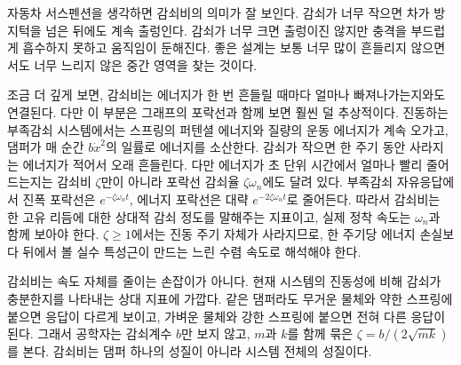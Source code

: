 자동차 서스펜션을 생각하면 감쇠비의 의미가 잘 보인다.
감쇠가 너무 작으면 차가 방지턱을 넘은 뒤에도 계속 출렁인다.
감쇠가 너무 크면 출렁이진 않지만 충격을 부드럽게 흡수하지 못하고 움직임이 둔해진다.
좋은 설계는 보통 너무 많이 흔들리지 않으면서도 너무 느리지 않은 중간 영역을 찾는 것이다.

조금 더 깊게 보면, 감쇠비는 에너지가 한 번 흔들릴 때마다 얼마나 빠져나가는지와도 연결된다.
다만 이 부분은 그래프의 포락선과 함께 보면 훨씬 덜 추상적이다.
진동하는 부족감쇠 시스템에서는 스프링의 퍼텐셜 에너지와 질량의 운동 에너지가 계속 오가고, 댐퍼가 매 순간 $b\dot{x}^2$의 일률로 에너지를 소산한다.
감쇠가 작으면 한 주기 동안 사라지는 에너지가 적어서 오래 흔들린다.
다만 에너지가 초 단위 시간에서 얼마나 빨리 줄어드는지는 감쇠비 $\zeta$만이 아니라 포락선 감쇠율 $\zeta\omega_n$에도 달려 있다.
부족감쇠 자유응답에서 진폭 포락선은 $e^{-\zeta\omega_n t}$, 에너지 포락선은 대략 $e^{-2\zeta\omega_n t}$로 줄어든다.
따라서 감쇠비는 한 고유 리듬에 대한 상대적 감쇠 정도를 말해주는 지표이고, 실제 정착 속도는 $\omega_n$과 함께 보아야 한다.
$\zeta\ge1$에서는 진동 주기 자체가 사라지므로, 한 주기당 에너지 손실보다 뒤에서 볼 실수 특성근이 만드는 느린 수렴 속도로 해석해야 한다.

감쇠비는 속도 자체를 줄이는 손잡이가 아니다.
현재 시스템의 진동성에 비해 감쇠가 충분한지를 나타내는 상대 지표에 가깝다.
같은 댐퍼라도 무거운 물체와 약한 스프링에 붙으면 응답이 다르게 보이고, 가벼운 물체와 강한 스프링에 붙으면 전혀 다른 응답이 된다.
그래서 공학자는 감쇠계수 $b$만 보지 않고, $m$과 $k$를 함께 묶은 $\zeta=b/(2\sqrt{mk})$를 본다.
감쇠비는 댐퍼 하나의 성질이 아니라 시스템 전체의 성질이다.

